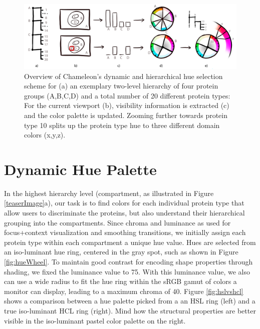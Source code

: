 \documentclass{egpubl}
\begin{document}
		\begin{figure}[t]
			\centering
			\includegraphics[width=0.95\linewidth]{Figures/coloroverview}
			\caption{Overview of Chameleon's dynamic and hierarchical hue selection scheme for (a) an exemplary two-level hierarchy of four protein groups (A,B,C,D) and a total number of 20 different protein types: For the current viewport (b), visibility information is extracted (c) and the color palette is updated. Zooming further towards protein type 10 splits up the protein type hue to three different domain colors (x,y,z).}
			\label{fig:coloroverview}
		\end{figure}
	
	\section{Dynamic Hue Palette}
	\label{sec:hue}
	
	In the highest hierarchy level (compartment, as illustrated in Figure \ref{teaserImage}a), our task is to find colors for each individual protein type that allow users to discriminate the proteins, but also understand their hierarchical grouping into the compartments. 
	Since chroma and luminance as used for focus+context visualization and smoothing transitions, we initially assign each protein type within each compartment a unique hue value. 
	Hues are selected from an iso-luminant hue ring, centered in the gray spot, such as shown in Figure \ref{fig:hueWheel}. 
	To maintain good contrast for encoding shape properties through shading, we fixed the luminance value to 75. 
	With this luminance value, we also can use a wide radius to fit the hue ring within the sRGB gamut of colors a monitor can display, leading to a maximum chroma of 40. 
	Figure \ref{fig:hslvshcl} shows a comparison between a hue palette picked from a an HSL ring (left) and a true iso-luminant HCL ring (right). 
	Mind how the structural properties are better visible in the iso-luminant pastel color palette on the right. 
	
\end{document}
